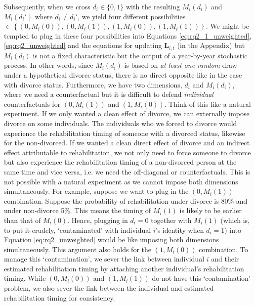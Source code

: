 \documentclass[a4paper,12pt]{article}
\theoremstyle{plain}
\theoremstyle{definition}
\theoremstyle{TheoremNum}
\theoremstyle{CorollaryNum}
\theoremstyle{PropositionNum}
\theoremstyle{TheoremNum}
\begin{document}
Subsequently, when we cross $d_i \in \{0,1\}$ with the resulting $M_{i}(d_i)$ and $M_i(d_i')$ where $d_i \neq d_i'$, we yield four different possibilities $\in \left\{(0,M_{i}(0)), (0,M_{i}(1)), (1, M_{i}(0)), (1, M_{i}(1))\right\}$. We might be tempted to plug in these four possibilities into Equations \ref{eq:rq2_1_unweighted}, \ref{eq:rq2_unweighted} and the equations for updating $\mathbf{L}_{i,t}$ (in the Appendix) but $M_i(d_i)$ is not a fixed characteristic but the output of a year-by-year stochastic process. In other words, since $M_{i}(d_i)$ is based on \textit{at least one random} draw under a hypothetical divorce status, there is no direct opposite like in the case with divorce status. Furthermore, we have two dimensions, $d_i$ and $M_{i}(d_i)$, where we need a counterfactual but it is difficult to defend \textit{individual} counterfactuals for $(0,M_{i}(1))$ and $(1, M_{i}(0))$. Think of this like a natural experiment. If we only wanted a clean effect of divorce, we can externally impose divorce on some individuals. The individuals who we forced to divorce would experience the rehabilitation timing of someone with a divorced status, likewise for the non-divorced. If we wanted a clean direct effect of divorce and an indirect effect attributable to rehabilitation, we not only need to force someone to divorce but also experience the rehabilitation timing of a non-divorced person at the same time and vice versa, i.e. we need the off-diagonal or counterfactuals. This is not possible with a natural experiment as we cannot impose both dimensions simultaneously. For example, suppose we want to plug in the $(0,M_{i}(1))$ combination. Suppose the probability of rehabilitation under divorce is 80\% and under non-divorce 5\%. This means the timing of $M_i(1)$ is likely to be earlier than that of $M_i(0)$. Hence, plugging in $d_i = 0$ together with $M_i(1)$ (which is, to put it crudely, `contaminated' with individual $i$'s identity when $d_i = 1$) into Equation \ref{eq:rq2_unweighted} would be like imposing both dimensions simultaneously. This argument also holds for the $(1, M_{i}(0))$ combination. To manage this `contamination', we sever the link between individual $i$ and their estimated rehabilitation timing by attaching another individual's rehabilitation timing. While $(0, M_i(0))$ and $(1, M_i(1))$ do not have this `contamination' problem, we also sever the link between the individual and estimated rehabilitation timing for consistency.
\end{document}
